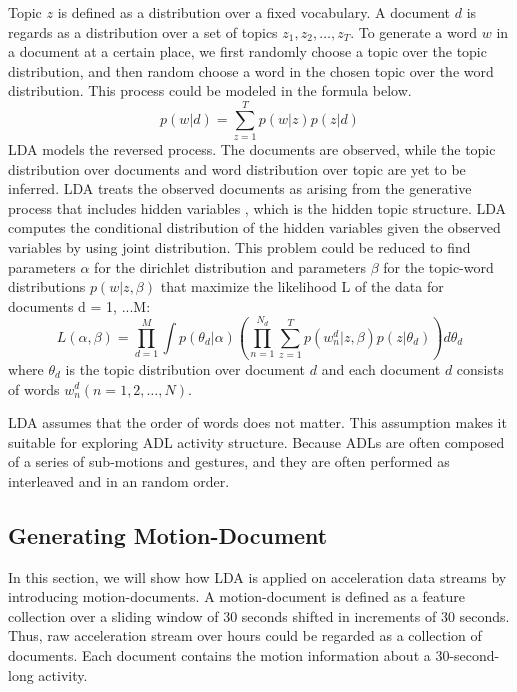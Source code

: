 \documentclass{sigchi}
\begin{document}
    Topic $z$ is defined as a distribution over a fixed vocabulary.
    A document $d$ is regards as a distribution over a set of topics $z_1,z_2,\ldots,z_T$.
    To generate a word $w$ in a document at a certain place, we first randomly choose a topic over the topic distribution, and then random choose a word in the chosen topic over the word distribution.
    This process could be modeled in the formula below.
        \begin{equation} p(w|d) = \sum_{z=1}^T p(w|z)p(z|d)\end{equation}
    LDA models the reversed process.
    The documents are observed, while the topic distribution over documents and word distribution over topic are yet to be inferred.
    LDA treats the observed documents as arising from the generative process that includes hidden variables \cite{randell2000context}, which is the hidden topic structure.
    LDA computes the conditional distribution of the hidden variables given the observed variables by using joint distribution.
    This problem could be reduced to find parameters $\alpha$ for the dirichlet distribution and parameters $\beta$ for the topic-word distributions $p(w|z,\beta)$ that maximize the likelihood L of the data for documents \cite{huynh2008discovery} d = 1, ...M:
        \begin{equation} L(\alpha, \beta) = \prod_{d=1}^M \int p(\theta_d | \alpha)(\prod_{n=1}^{N_d}\sum_{z=1}^T p(w_n^d | z, \beta) p(z|\theta_d)) d\theta_d \end{equation}
        where $\theta_d$ is the topic distribution over document $d$ and each document $d$ consists of words $w_n^d (n=1,2,\ldots,N)$.

    LDA assumes that the order of words does not matter.
    This assumption makes it suitable for exploring ADL activity structure.
    Because ADLs are often composed of a series of sub-motions and gestures, and they are often performed as interleaved and in an random order.

    \subsection{Generating Motion-Document}

    In this section, we will show how LDA is applied on acceleration data streams by introducing motion-documents.
    A motion-document is defined as a feature collection over a sliding window of 30 seconds shifted in increments of 30 seconds.
    Thus, raw acceleration stream over hours could be regarded as a collection of documents.
    Each document contains the motion information about a 30-second-long activity.
\end{document}
